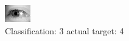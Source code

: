 \begin{figure}[h!]
\begin{center}
\includegraphics[width=0.60\columnwidth]{figures/ID3224_class_3_target_4.png}
\end{center}
\caption{ Classification: 3 actual target: 4}
\label{fig:ID3224_class_3_target_4}
\end{figure}
